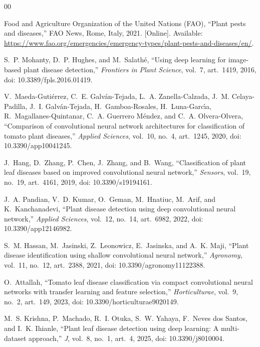 \documentclass[conference]{IEEEtran}
\begin{document}
\begin{thebibliography}{00}

Food and Agriculture Organization of the United Nations (FAO), ``Plant pests and diseases,'' FAO News, Rome, Italy, 2021. [Online]. Available: \url{https://www.fao.org/emergencies/emergency-types/plant-pests-and-diseases/en/}.

S.~P. Mohanty, D.~P. Hughes, and M.~Salath{\'e}, ``Using deep learning for image-based plant disease detection,'' \textit{Frontiers in Plant Science}, vol.~7, art.~1419, 2016, doi: 10.3389/fpls.2016.01419.

V.~Maeda-Guti{\'e}rrez, C.~E. Galv{\'a}n-Tejada, L.~A. Zanella-Calzada, J.~M. Celaya-Padilla, J.~I. Galv{\'a}n-Tejada, H.~Gamboa-Rosales, H.~Luna-Garc{\'\i}a, R.~Magallanes-Quintanar, C.~A. Guerrero M{\'e}ndez, and C.~A. Olvera-Olvera, ``Comparison of convolutional neural network architectures for classification of tomato plant diseases,'' \textit{Applied Sciences}, vol.~10, no.~4, art.~1245, 2020, doi: 10.3390/app10041245.

J.~Hang, D.~Zhang, P.~Chen, J.~Zhang, and B.~Wang, ``Classification of plant leaf diseases based on improved convolutional neural network,'' \textit{Sensors}, vol.~19, no.~19, art.~4161, 2019, doi: 10.3390/s19194161.

J.~A. Pandian, V.~D. Kumar, O.~Geman, M.~Hnatiuc, M.~Arif, and K.~Kanchanadevi, ``Plant disease detection using deep convolutional neural network,'' \textit{Applied Sciences}, vol.~12, no.~14, art.~6982, 2022, doi: 10.3390/app12146982.

S.~M. Hassan, M.~Jasinski, Z.~Leonowicz, E.~Jasinska, and A.~K. Maji, ``Plant disease identification using shallow convolutional neural network,'' \textit{Agronomy}, vol.~11, no.~12, art.~2388, 2021, doi: 10.3390/agronomy11122388.

O.~Attallah, ``Tomato leaf disease classification via compact convolutional neural networks with transfer learning and feature selection,'' \textit{Horticulturae}, vol.~9, no.~2, art.~149, 2023, doi: 10.3390/horticulturae9020149.

M.~S. Krishna, P.~Machado, R.~I. Otuka, S.~W. Yahaya, F.~Neves dos Santos, and I.~K. Ihianle, ``Plant leaf disease detection using deep learning: A multi-dataset approach,'' \textit{J}, vol.~8, no.~1, art.~4, 2025, doi: 10.3390/j8010004.


\end{thebibliography}
\end{document}
